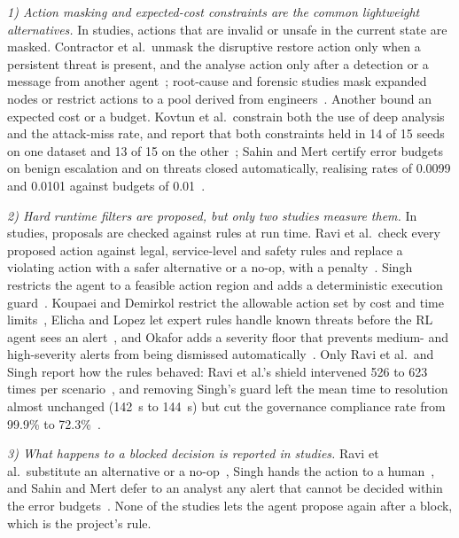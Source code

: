 \emph{1) Action masking and expected-cost constraints are the common lightweight alternatives.} In \NMask{} studies, actions that are invalid or unsafe in the current state are masked. Contractor et al.\ unmask the disruptive restore action only when a persistent threat is present, and the analyse action only after a detection or a message from another agent~\cite{contractor2025}; root-cause and forensic studies mask expanded nodes or restrict actions to a pool derived from engineers~\cite{wang2024mrca,rojasrodriguez2026,ding2023,ghanem2026,wu2026}. Another \NCostCon{} bound an expected cost or a budget. Kovtun et al.\ constrain both the use of deep analysis and the attack-miss rate, and report that both constraints held in 14 of 15 seeds on one dataset and 13 of 15 on the other~\cite{kovtun2026}; Sahin and Mert certify error budgets on benign escalation and on threats closed automatically, realising rates of 0.0099 and 0.0101 against budgets of 0.01~\cite{sahin2026}.

\emph{2) Hard runtime filters are proposed, but only two studies measure them.} In \NShield{} studies, proposals are checked against rules at run time. Ravi et al.\ check every proposed action against legal, service-level and safety rules and replace a violating action with a safer alternative or a no-op, with a penalty~\cite{ravi2025}. Singh restricts the agent to a feasible action region and adds a deterministic execution guard~\cite{singh2026}. Koupaei and Demirkol restrict the allowable action set by cost and time limits~\cite{koupaei2026}, Elicha and Lopez let expert rules handle known threats before the RL agent sees an alert~\cite{elicha2026}, and Okafor adds a severity floor that prevents medium- and high-severity alerts from being dismissed automatically~\cite{okafor2026}. Only Ravi et al.\ and Singh report how the rules behaved: Ravi et al.'s shield intervened 526 to 623 times per scenario~\cite{ravi2025}, and removing Singh's guard left the mean time to resolution almost unchanged (142~s to 144~s) but cut the governance compliance rate from 99.9\% to 72.3\%~\cite{singh2026}.

\emph{3) What happens to a blocked decision is reported in \NBlocked{} studies.} Ravi et al.\ substitute an alternative or a no-op~\cite{ravi2025}, Singh hands the action to a human~\cite{singh2026}, and Sahin and Mert defer to an analyst any alert that cannot be decided within the error budgets~\cite{sahin2026}. None of the studies lets the agent propose again after a block, which is the project's rule.

